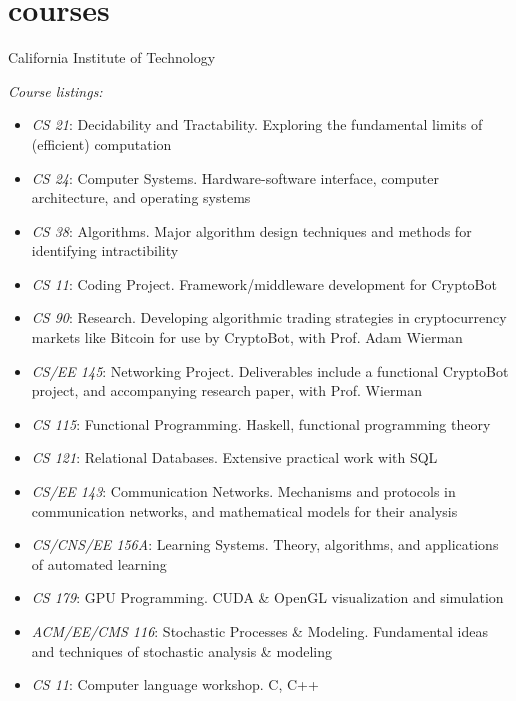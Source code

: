 \documentclass[]{mills-cv} %
\begin{document}
\newpage


\section{courses}

\begin{entrylist}
\entry
{}
{California Institute of Technology}
{}
{\emph{Course listings:}
\begin{itemize}
\item \emph{CS 21}: Decidability and Tractability. Exploring the fundamental limits of (efficient) computation
\item \emph{CS 24}: Computer Systems. Hardware-software interface, computer architecture, and operating systems
\item \emph{CS 38}: Algorithms. Major algorithm design techniques and methods for identifying intractibility
\item \emph{CS 11}: Coding Project. Framework/middleware development for CryptoBot
\item \emph{CS 90}: Research. Developing algorithmic trading strategies in cryptocurrency markets like Bitcoin for use by CryptoBot, with Prof. Adam Wierman
\item \emph{CS/EE 145}: Networking Project. Deliverables include a functional CryptoBot project, and accompanying research paper, with Prof. Wierman
\item \emph{CS 115}: Functional Programming. Haskell, functional programming theory
\item \emph{CS 121}: Relational Databases. Extensive practical work with SQL
\item \emph{CS/EE 143}: Communication Networks. Mechanisms and protocols in communication networks, and mathematical models for their analysis
\item \emph{CS/CNS/EE 156A}: Learning Systems. Theory, algorithms, and applications of automated learning
\item \emph{CS 179}: GPU Programming. CUDA \& OpenGL visualization and simulation
\item \emph{ACM/EE/CMS 116}: Stochastic Processes \& Modeling. Fundamental ideas and techniques of stochastic analysis \& modeling
\item \emph{CS 11}: Computer language workshop. C, C++

\end{itemize}}
\end{entrylist}
\end{document}
